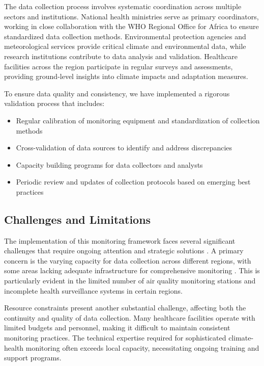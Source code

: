 The data collection process involves systematic coordination across multiple sectors and institutions. National health ministries serve as primary coordinators, working in close collaboration with the WHO Regional Office for Africa to ensure standardized data collection methods. Environmental protection agencies and meteorological services provide critical climate and environmental data, while research institutions contribute to data analysis and validation. Healthcare facilities across the region participate in regular surveys and assessments, providing ground-level insights into climate impacts and adaptation measures.

To ensure data quality and consistency, we have implemented a rigorous validation process that includes:
\begin{itemize}
    \item Regular calibration of monitoring equipment and standardization of collection methods
    \item Cross-validation of data sources to identify and address discrepancies
    \item Capacity building programs for data collectors and analysts
    \item Periodic review and updates of collection protocols based on emerging best practices
\end{itemize}

\subsection{Challenges and Limitations}
The implementation of this monitoring framework faces several significant challenges that require ongoing attention and strategic solutions \citep{who2024}. A primary concern is the varying capacity for data collection across different regions, with some areas lacking adequate infrastructure for comprehensive monitoring \citep{lancet_africa2023}. This is particularly evident in the limited number of air quality monitoring stations and incomplete health surveillance systems in certain regions.

Resource constraints present another substantial challenge, affecting both the continuity and quality of data collection. Many healthcare facilities operate with limited budgets and personnel, making it difficult to maintain consistent monitoring practices. The technical expertise required for sophisticated climate-health monitoring often exceeds local capacity, necessitating ongoing training and support programs.

